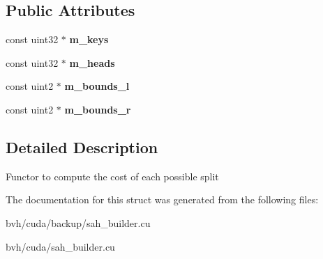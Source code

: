 \subsection*{\-Public \-Attributes}
\begin{DoxyCompactItemize}
\item 
\hypertarget{structnih_1_1cuda_1_1sah_1_1_cost__functor_a0342b4ecc5071a799c38c0c78210b16d}{
const uint32 $\ast$ {\bfseries m\-\_\-keys}}
\label{structnih_1_1cuda_1_1sah_1_1_cost__functor_a0342b4ecc5071a799c38c0c78210b16d}

\item 
\hypertarget{structnih_1_1cuda_1_1sah_1_1_cost__functor_a0d76a74ad352bc462b5e604b6560e917}{
const uint32 $\ast$ {\bfseries m\-\_\-heads}}
\label{structnih_1_1cuda_1_1sah_1_1_cost__functor_a0d76a74ad352bc462b5e604b6560e917}

\item 
\hypertarget{structnih_1_1cuda_1_1sah_1_1_cost__functor_ab0cd9dc0b011dd5689214b4d77c635a9}{
const uint2 $\ast$ {\bfseries m\-\_\-bounds\-\_\-l}}
\label{structnih_1_1cuda_1_1sah_1_1_cost__functor_ab0cd9dc0b011dd5689214b4d77c635a9}

\item 
\hypertarget{structnih_1_1cuda_1_1sah_1_1_cost__functor_ad345951b0d487eb2c5b05753bef1c7c9}{
const uint2 $\ast$ {\bfseries m\-\_\-bounds\-\_\-r}}
\label{structnih_1_1cuda_1_1sah_1_1_cost__functor_ad345951b0d487eb2c5b05753bef1c7c9}

\end{DoxyCompactItemize}


\subsection{\-Detailed \-Description}
\-Functor to compute the cost of each possible split 

\-The documentation for this struct was generated from the following files\-:\begin{DoxyCompactItemize}
\item 
bvh/cuda/backup/sah\-\_\-builder.\-cu\item 
bvh/cuda/sah\-\_\-builder.\-cu\end{DoxyCompactItemize}
